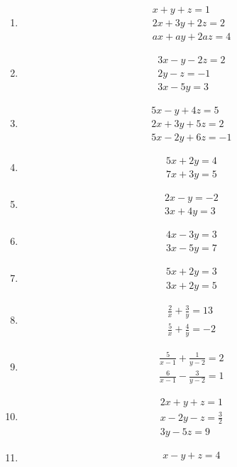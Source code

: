\begin{enumerate}[label=\thesubsection.\arabic*,ref=\thesubsection.\theenumi]
\item
\begin{align}
 x+y+z = 1\\
 2x+3y+2z = 2\\
 ax+ay+2az = 4
\end{align}
\item
\begin{align}
 3x-y-2z = 2\\
 2y-z = -1\\
 3x-5y = 3
\end{align}
\item 
\begin{align}
 5x-y+4z = 5\\
 2x+3y+5z = 2\\
 5x-2y+6z = -1
\end{align}
\item   
\begin{align}
5x+2y = 4\\
7x+3y = 5
\end{align}
\item 
\begin{align}
 2x-y = -2\\
 3x+4y = 3
\end{align}
\item
\begin{align}
 4x-3y = 3\\
 3x-5y = 7
\end{align}
\item
\begin{align} 
 5x+2y = 3\\
 3x+2y = 5
\end{align}
\item 
\begin{align}
\frac{2}{x}+\frac{3}{y}= 13 \\ \frac{5}{x}+\frac{4}{y} = -2
\end{align}
\item 
\begin{align}
\frac{5}{x-1}+\frac{1}{y-2}= 2 \\ \frac{6}{x-1}-\frac{3}{y-2}= 1
\end{align}
\item
\begin{align}
 2x+y+z = 1\\
 x-2y-z = \frac{3}{2} \\
 3y-5z = 9
\end{align}
\item
\begin{align}
 x-y+z = 4\\

\end{align}
\end{enumerate}
